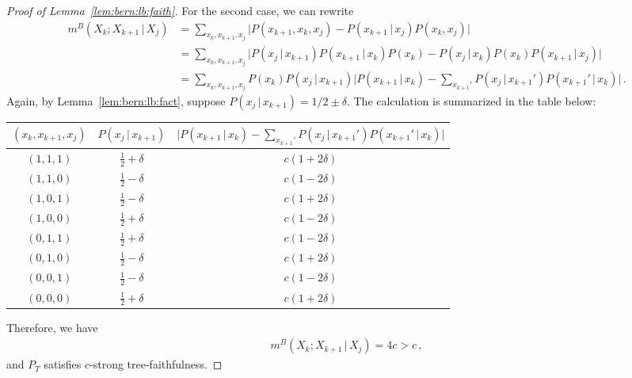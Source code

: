 \documentclass{article}
\theoremstyle{definition}
\theoremstyle{definition}
\theoremstyle{definition}
\theoremstyle{definition}
\theoremstyle{definition}
\theoremstyle{definition}
\theoremstyle{remark}
\theoremstyle{remark}
\newcommand{\given}{\,|\,}
\newcommand{\dpdm}{m}
\begin{document}
\begin{proof}[Proof of Lemma~\ref{lem:bern:lb:faith}]
For the second case, we can rewrite
\begin{align*}
    \dpdm^B(X_k;X_{k+1}\given X_j) & = \sum_{x_{k},x_{k+1},x_j}  \Big|P(x_{k+1},x_k, x_j) - P(x_{k+1}\given  x_j) P(x_k , x_j) \Big| \\
    & = \sum_{x_{k},x_{k+1},x_j}  \Big|P(x_j\given x_{k+1})P(x_{k+1}\given x_k)P(x_k) - P(x_j\given x_{k})P(x_k) P(x_{k+1} \given x_j) \Big| \\
    & = \sum_{x_{k},x_{k+1},x_j} P(x_k) P(x_j \given x_{k+1}) \Big|P(x_{k+1}\given x_k) - \sum_{x_{k+1}'}P(x_j\given x_{k+1}')P(x_{k+1}'\given x_k) \Big| \,.
\end{align*}
Again, by Lemma~\ref{lem:bern:lb:fact}, suppose $P(x_j\given x_{k+1})=1/2\pm\delta$. The calculation is summarized in the table below:
\begin{table}[h]
\centering
\begin{tabular}{@{}ccc@{}}
\toprule
$(x_{k},x_{k+1},x_j)$ & $P(x_j\given x_{k+1})$ & $\Big|P(x_{k+1}\given x_k) - \sum_{x_{k+1}'}P(x_j\given x_{k+1}')P(x_{k+1}'\given x_k) \Big|$ \\ \midrule
$(1,1,1)$             & $\frac{1}{2} + \delta$ & $c(1+2\delta)$                                                                             \\
$(1,1,0)$             & $\frac{1}{2} - \delta$ & $c(1-2\delta)$                                                                             \\
$(1,0,1)$             & $\frac{1}{2} - \delta$ & $c(1+2\delta)$                                                                             \\
$(1,0,0)$             & $\frac{1}{2} + \delta$ & $c(1-2\delta)$                                                                             \\
$(0,1,1)$             & $\frac{1}{2} + \delta$ & $c(1-2\delta)$                                                                             \\
$(0,1,0)$             & $\frac{1}{2} - \delta$ & $c(1+2\delta)$                                                                             \\
$(0,0,1)$             & $\frac{1}{2} - \delta$ & $c(1-2\delta)$                                                                             \\
$(0,0,0)$             & $\frac{1}{2} + \delta$ & $c(1+2\delta)$                                                                             \\ \bottomrule
\end{tabular}
\end{table}

\noindent 
Therefore, we have 
\begin{align*}
    \dpdm^B(X_k;X_{k+1}\given X_j) =  4c > c \,,
\end{align*}
and $P_T$ satisfies $c$-strong tree-faithfulness.
\end{proof}
\end{document}
